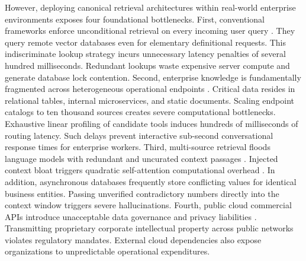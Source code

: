 \documentclass[conference,onecolumn,10pt]{IEEEtran}
\begin{document}
However, deploying canonical retrieval architectures within real-world enterprise environments exposes four foundational bottlenecks. First, conventional frameworks enforce unconditional retrieval on every incoming user query \cite{karpukhin2020dpr}. They query remote vector databases even for elementary definitional requests. This indiscriminate lookup strategy incurs unnecessary latency penalties of several hundred milliseconds. Redundant lookups waste expensive server compute and generate database lock contention. Second, enterprise knowledge is fundamentally fragmented across heterogeneous operational endpoints \cite{thakur2021beir}. Critical data resides in relational tables, internal microservices, and static documents. Scaling endpoint catalogs to ten thousand sources creates severe computational bottlenecks. Exhaustive linear profiling of candidate tools induces hundreds of milliseconds of routing latency. Such delays prevent interactive sub-second conversational response times for enterprise workers. Third, multi-source retrieval floods language models with redundant and uncurated context passages \cite{liu2024lost_in_the_middle}. Injected context bloat triggers quadratic self-attention computational overhead \cite{vaswani2017attention,dao2022flashattention}. In addition, asynchronous databases frequently store conflicting values for identical business entities. Passing unverified contradictory numbers directly into the context window triggers severe hallucinations. Fourth, public cloud commercial APIs introduce unacceptable data governance and privacy liabilities \cite{voigt2017eu_gdpr}. Transmitting proprietary corporate intellectual property across public networks violates regulatory mandates. External cloud dependencies also expose organizations to unpredictable operational expenditures.
\end{document}
